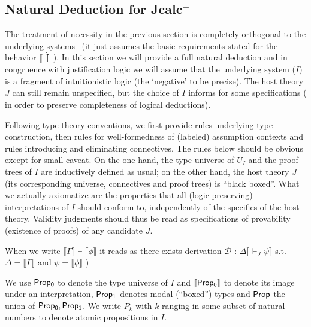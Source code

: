 	\subsection{Natural Deduction for Jcalc$^{-}$}
	The treatment of necessity in the previous section is completely orthogonal to the underlying systems \
	(it just assumes the basic requirements stated for the behavior $\llbracket\dot\rrbracket$). 
	In this section we will provide a full natural deduction and in congruence with justification logic we will
	assume that the underlying system ($I$) is a fragment of intuitionistic logic (the `negative' to be precise).
	The host theory $J$ can still remain unspecified, but the choice of $I$ informs for some specifications ( in order to preserve
	completeness of logical deductions).   

	Following type theory conventions,  we first provide rules underlying type construction, then  rules for  well-formedness of (labeled) assumption contexts and rules  introducing and eliminating connectives. 
	The rules below should be obvious except for small caveat.
	 On the one hand, the type universe of $U_I$ and the proof trees of $I$ are 
	inductively defined as usual; on the other 
	hand, the host theory $J$ (its corresponding universe, connectives and  proof trees) is  ``black boxed''. What we actually axiomatize are the properties that all
	(logic preserving) interpretations of $I$ should conform to, independently of the specifics of the host theory. 
	Validity judgments should thus be read  as specifications
	of provability (existence of proofs) of any candidate $J$. 
	
	When we write $\llbracket \Gamma\rrbracket\vdash\llbracket\phi\rrbracket$ it reads as there exists derivation
	$\mathcal{D}$ : $\Delta\rrbracket\vdash_{J}\psi\rrbracket$ s.t. $\Delta=\llbracket\Gamma\rrbracket$ and $\psi = \llbracket \phi\rrbracket$ )
	
	We use ${\sf Prop_0}$  to denote  the type universe of $I$ and $\llbracket \sf Prop_0\rrbracket $ to denote its image under an interpretation, ${\sf Prop_1}$ denotes   modal (``boxed'') types
	and ${\sf Prop}$  the union of ${\sf Prop_0, Prop_1}$. We write $P_k$ with $k$ ranging in some subset of natural numbers to denote atomic propositions in $I$. 
	
	
	
